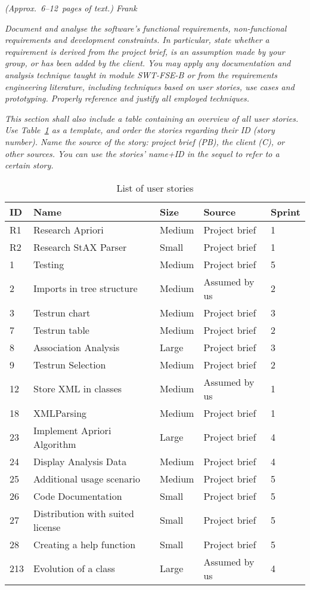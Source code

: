 \emph{(Approx.~6--12~pages of text.) Frank}

\emph{Document and analyse the software's functional requirements, 
non-functional requirements and development constraints. In particular, state 
whether a requirement is derived from the project brief, is an assumption made 
by your group, or has been added by the client. You may apply any documentation 
and analysis technique taught in module SWT-FSE-B or from the 
requirements engineering literature, including techniques based on user stories, 
use cases and prototyping. Properly reference and justify all employed 
techniques.}

\emph{This section shall also include a table containing an overview of all user 
stories. Use Table~\ref{tab:user_stories} as a template, and order the stories 
regarding their ID (story number). Name the source of the story: project brief 
(PB), the client (C), or other sources. You can use the stories' name+ID in the 
sequel to refer to a certain story.}

\begin{table}[!h]
  \caption{List of user stories}
  \centering
  \begin{tabular}{l||l|l|l|l|}
    ID & Name & Size &  Source & Sprint\\
    \hline
    R1&Research Apriori&Medium&Project brief&1\\
    R2&Research StAX Parser&Small&Project brief&1\\
    1&Testing&Medium&Project brief&5\\
    2&Imports in tree structure&Medium&Assumed by us&2\\ %
    3&Testrun chart&Medium&Project brief&3\\
    7&Testrun table&Medium&Project brief&2\\
    8&Association Analysis&Large&Project brief&3\\
    9&Testrun Selection&Medium&Project brief&2\\
    12&Store XML in classes&Medium&Assumed by us&1\\ 
    18&XMLParsing&Medium&Project brief&1\\
    23&Implement Apriori Algorithm&Large&Project brief&4\\
    24&Display Analysis Data&Medium&Project brief&4\\
    25&Additional usage scenario&Medium&Project brief&5\\
    26&Code Documentation&Small&Project brief&5\\
    27&Distribution with suited license&Small&Project brief&5\\ %
    28&Creating a help function&Small&Project brief&5\\
    213&Evolution of a class&Large&Assumed by us&4\\ 
  
	\end{tabular}
  \label{tab:user_stories}
\end{table}

